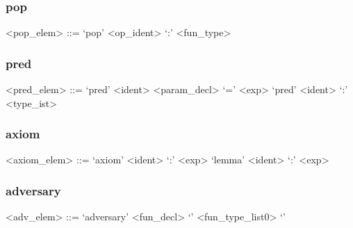 \subsubsection*{pop}
\begin{ecgrammar}
<pop_elem> ::= `pop' <op_ident> `:' <fun_type>
\end{ecgrammar}

\subsubsection*{pred}
\begin{ecgrammar}
<pred_elem> ::=  `pred' <ident> <param_decl> `=' <exp>
            \alt `pred' <ident> `:' <type_ist> 
\end{ecgrammar}

\subsubsection*{axiom}
\begin{ecgrammar}
<axiom_elem> ::=  `axiom' <ident> `:' <exp>
             \alt `lemma' <ident> `:' <exp>
\end{ecgrammar}

\subsubsection*{adversary}
\begin{ecgrammar}
<adv_elem> ::= `adversary' <fun_decl> `{' <fun_type_list0> `}' 
\end{ecgrammar}

